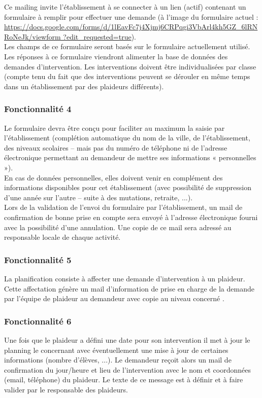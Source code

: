Ce mailing invite l'établissement à se connecter à un lien (actif) contenant un formulaire à remplir pour effectuer une demande (à l'image du formulaire actuel :
\url{https://docs.google.com/forms/d/1lEavFc7j4Xjmj6CRPqgi3VbArl4kh5GZ_6lRNRoNeJk/viewform
?edit_requested=true}).
\\
Les champs de ce formulaire seront basés sur le formulaire actuellement utilisé.  Les réponses à ce formulaire viendront alimenter la base de données des demandes d'intervention. Les interventions doivent être individualisées par classe (compte tenu du fait que des interventions peuvent se dérouler en même temps dans un établissement par des plaideurs différents). 
\\

\subsubsection{Fonctionnalité 4}
Le formulaire devra être conçu pour faciliter au maximum la saisie par
l'établissement (complétion automatique du nom de la ville, de l'établissement, des niveaux scolaires – mais pas du numéro de téléphone ni de l'adresse électronique permettant au demandeur de mettre ses informations « personnelles »).\\
En cas de données personnelles, elles doivent venir en complément des informations disponibles pour cet établissement (avec possibilité de suppression d'une année sur l'autre – suite à des mutations, retraite, ...). \\
Lors de la validation de l'envoi du formulaire par l'établissement, un mail de confirmation de bonne prise en compte sera envoyé à l'adresse électronique fourni avec la possibilité d'une annulation. Une copie de ce mail sera adressé au responsable locale de chaque activité.
\\

\subsubsection{Fonctionnalité 5}
La planification consiste à affecter une demande d'intervention à un plaideur.\\
Cette affectation génère un mail d'information de prise en charge de la demande par l'équipe de
plaideur au demandeur avec copie au niveau concerné .
\\

\subsubsection{Fonctionnalité 6}
Une fois que le plaideur a défini une date pour son intervention il met à jour le
planning le concernant avec éventuellement une mise à jour de certaines informations (nombre d'élèves, ...). Le demandeur reçoit alors un mail de confirmation du jour/heure et lieu de l'intervention avec le nom et coordonnées (email, téléphone) du plaideur. Le texte de ce message est à définir et à faire valider par le responsable des plaideurs. \\

